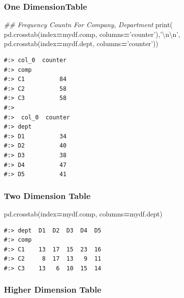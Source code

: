 \documentclass[
]{book}
\newenvironment{Shaded}{\begin{snugshade}}{\end{snugshade}}
\newcommand{\BuiltInTok}[1]{#1}
\newcommand{\CharTok}[1]{\textcolor[rgb]{0.5,0.5,0.5}{#1}}
\newcommand{\CommentTok}[1]{\textcolor[rgb]{0.37,0.37,0.37}{\textit{#1}}}
\newcommand{\NormalTok}[1]{#1}
\newcommand{\OperatorTok}[1]{\textcolor[rgb]{0.43,0.43,0.43}{\textbf{#1}}}
\newcommand{\StringTok}[1]{\textcolor[rgb]{0.5,0.5,0.5}{#1}}
\begin{document}
\hypertarget{one-dimensiontable}{%
\subsubsection{One DimensionTable}\label{one-dimensiontable}}

\begin{Shaded}
\begin{Highlighting}[]
\CommentTok{## Frequency Countn For Company, Department}
\BuiltInTok{print}\NormalTok{(}
\NormalTok{  pd.crosstab(index}\OperatorTok{=}\NormalTok{mydf.comp, columns}\OperatorTok{=}\StringTok{'counter'}\NormalTok{),}\StringTok{'}\CharTok{\textbackslash{}n\textbackslash{}n}\StringTok{'}\NormalTok{,}
\NormalTok{  pd.crosstab(index}\OperatorTok{=}\NormalTok{mydf.dept, columns}\OperatorTok{=}\StringTok{'counter'}\NormalTok{))}
\end{Highlighting}
\end{Shaded}

\begin{verbatim}
#:> col_0  counter
#:> comp          
#:> C1          84
#:> C2          58
#:> C3          58 
#:> 
#:>  col_0  counter
#:> dept          
#:> D1          34
#:> D2          40
#:> D3          38
#:> D4          47
#:> D5          41
\end{verbatim}

\hypertarget{two-dimension-table}{%
\subsubsection{Two Dimension Table}\label{two-dimension-table}}

\begin{Shaded}
\begin{Highlighting}[]
\NormalTok{pd.crosstab(index}\OperatorTok{=}\NormalTok{mydf.comp, columns}\OperatorTok{=}\NormalTok{mydf.dept)}
\end{Highlighting}
\end{Shaded}

\begin{verbatim}
#:> dept  D1  D2  D3  D4  D5
#:> comp                    
#:> C1    13  17  15  23  16
#:> C2     8  17  13   9  11
#:> C3    13   6  10  15  14
\end{verbatim}

\hypertarget{higher-dimension-table}{%
\subsubsection{Higher Dimension Table}\label{higher-dimension-table}}
\end{document}
